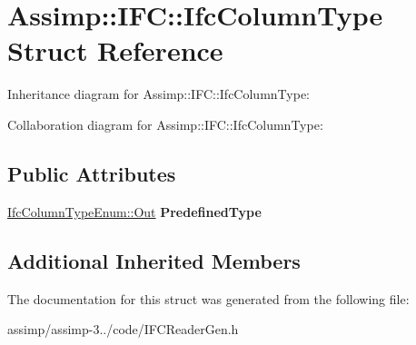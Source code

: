 \hypertarget{struct_assimp_1_1_i_f_c_1_1_ifc_column_type}{\section{Assimp\+:\+:I\+F\+C\+:\+:Ifc\+Column\+Type Struct Reference}
\label{struct_assimp_1_1_i_f_c_1_1_ifc_column_type}
}


Inheritance diagram for Assimp\+:\+:I\+F\+C\+:\+:Ifc\+Column\+Type\+:


Collaboration diagram for Assimp\+:\+:I\+F\+C\+:\+:Ifc\+Column\+Type\+:
\subsection*{Public Attributes}
\begin{DoxyCompactItemize}
\item 
\hypertarget{struct_assimp_1_1_i_f_c_1_1_ifc_column_type_a2358a15281c0905e73e029739d798d64}{\hyperlink{classboost_1_1shared__ptr}{Ifc\+Column\+Type\+Enum\+::\+Out} {\bfseries Predefined\+Type}}\label{struct_assimp_1_1_i_f_c_1_1_ifc_column_type_a2358a15281c0905e73e029739d798d64}

\end{DoxyCompactItemize}
\subsection*{Additional Inherited Members}


The documentation for this struct was generated from the following file\+:\begin{DoxyCompactItemize}
\item 
assimp/assimp-\/3../code/I\+F\+C\+Reader\+Gen.\+h\end{DoxyCompactItemize}
